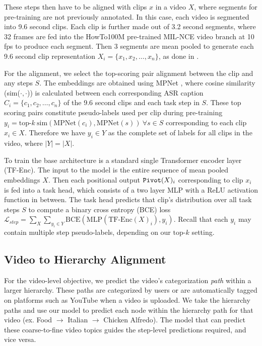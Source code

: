 These steps then have to be aligned with clips $x$ in a video $X$, where segments for pre-training are not previously annotated. In this case, each video is segmented into 9.6 second clips. Each clip is further made out of 3.2 second segments, where 32 frames are fed into the HowTo100M pre-trained MIL-NCE video branch \citep{miech19howto100m} at 10 fps to produce each segment. Then 3 segments are mean pooled to generate each 9.6 second clip representation $X_i = \{x_1, x_2, \dots, x_n\}$, as done in \cite{paprika}. 

For the alignment, we select the top-scoring pair alignment between the clip and any steps $S$. The embeddings are obtained using MPNet \citep{mpnet}, where cosine similarity (sim($\cdot, \cdot$)) is calculated between each corresponding ASR caption $C_i = \{c_1, c_2, \dots, c_n\}$ of the 9.6 second clips and each task step in $S$. These top scoring pairs constitute pseudo-labels used per clip during pre-training $y_i = \text{top-}k\ \text{sim}(\text{MPNet}(c_i), \text{MPNet}(s))\ \forall s \in S$ corresponding to each clip $x_i \in X$. Therefore we have $y_i \in Y$ as the complete set of labels for all clips in the video, where $|Y| = |X|$. 

To train \model{} the base architecture is a standard single  Transformer encoder layer (TF-Enc). The input to the model is the entire sequence of mean pooled embeddings $X$. Then each positional output $\model(X)_i$ corresponding to clip $x_i$ is fed into a task head, which consists of a two layer MLP with a ReLU activation function in between. The task head predicts that clip's distribution over all task steps $S$ to compute a binary cross entropy (BCE) loss $\mathcal{L}_{step} = \sum_{X}\sum_{y_i \in Y}\text{BCE}(\text{MLP}(\text{TF-Enc}(X)_i), y_i)$. Recall that each $y_i$ may contain multiple step pseudo-labels, depending on our $\text{top-}k$ setting.

\subsection{Video to Hierarchy Alignment}
\label{methods:video_hier}

For the video-level objective, we predict the video's categorization \emph{path} within a larger hierarchy. These paths are categorized by users or are automatically tagged on platforms such as YouTube when a video is uploaded. We take the hierarchy paths and use our model to predict each node within the hierarchy path for that video (ex. Food $\rightarrow$ Italian $\rightarrow$ Chicken Alfredo). The model that can predict these coarse-to-fine video topics guides the step-level predictions required, and vice versa. 

